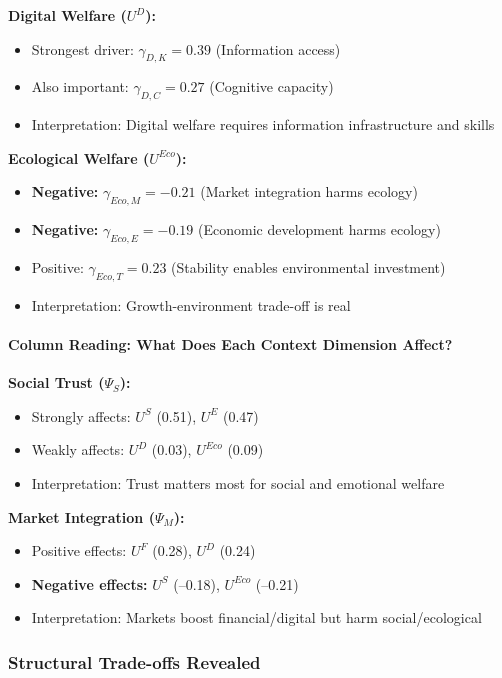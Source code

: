 \textbf{Digital Welfare ($U^D$):}
\begin{itemize}
\item Strongest driver: $\gamma_{D,K} = 0.39$ (Information access)
\item Also important: $\gamma_{D,C} = 0.27$ (Cognitive capacity)
\item Interpretation: Digital welfare requires information infrastructure and skills
\end{itemize}

\textbf{Ecological Welfare ($U^{Eco}$):}
\begin{itemize}
\item \textbf{Negative:} $\gamma_{Eco,M} = -0.21$ (Market integration harms ecology)
\item \textbf{Negative:} $\gamma_{Eco,E} = -0.19$ (Economic development harms ecology)
\item Positive: $\gamma_{Eco,T} = 0.23$ (Stability enables environmental investment)
\item Interpretation: Growth-environment trade-off is real
\end{itemize}

\paragraph{Column Reading: What Does Each Context Dimension Affect?}

\textbf{Social Trust ($\Psi_S$):}
\begin{itemize}
\item Strongly affects: $U^S$ (0.51), $U^E$ (0.47)
\item Weakly affects: $U^D$ (0.03), $U^{Eco}$ (0.09)
\item Interpretation: Trust matters most for social and emotional welfare
\end{itemize}

\textbf{Market Integration ($\Psi_M$):}
\begin{itemize}
\item Positive effects: $U^F$ (0.28), $U^D$ (0.24)
\item \textbf{Negative effects:} $U^S$ (--0.18), $U^{Eco}$ (--0.21)
\item Interpretation: Markets boost financial/digital but harm social/ecological
\end{itemize}

\subsubsection{Structural Trade-offs Revealed}

